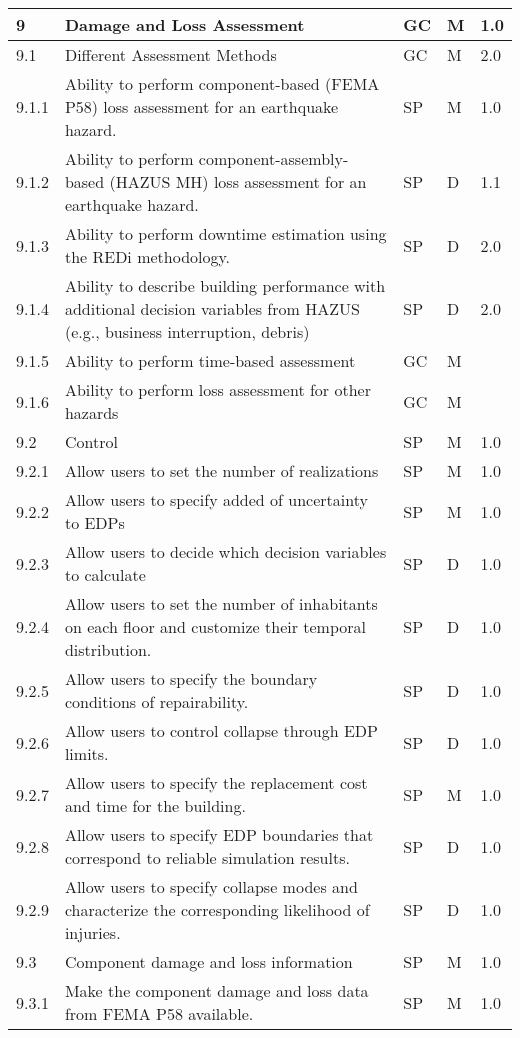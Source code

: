 \begin{longtable}{| p{} | p{} | p{} | p{} |  p{} |}
9 & \textbf{Damage and Loss Assessment} & GC & M & 1.0\\ \hline
9.1 & Different Assessment Methods & GC & M & 2.0 \\ \hline
9.1.1 & Ability to perform component-based (FEMA P58) loss assessment for an earthquake hazard. & SP & M & 1.0 \\ \hline
9.1.2 & Ability to perform component-assembly-based (HAZUS MH) loss assessment for an earthquake hazard. & SP & D & 1.1 \\ \hline
9.1.3 & Ability to perform downtime estimation using the REDi methodology. & SP & D & 2.0 \\ \hline
9.1.4 & Ability to describe building performance with additional decision variables from HAZUS (e.g., business interruption, debris) & SP & D & 2.0 \\ \hline
9.1.5 &  Ability to perform time-based assessment & GC & M &  \\ \hline
9.1.6 & Ability to perform loss assessment for other hazards & GC & M &  \\ \hline
9.2 & Control & SP & M & 1.0 \\ \hline
9.2.1 & Allow users to set the number of realizations & SP & M & 1.0\\ \hline
9.2.2 &  Allow users to specify added of uncertainty to EDPs & SP & M & 1.0 \\ \hline
9.2.3 &  Allow users to decide which decision variables to calculate & SP & D & 1.0 \\ \hline
9.2.4 &  Allow users to set the number of inhabitants on each floor and customize their temporal distribution. & SP & D & 1.0 \\ \hline
9.2.5 &  Allow users to specify the boundary conditions of repairability. & SP & D & 1.0 \\ \hline
9.2.6 &  Allow users to control collapse through EDP limits. & SP & D & 1.0\\ \hline
9.2.7 &  Allow users to specify the replacement cost and time for the building. & SP & M & 1.0 \\ \hline
9.2.8 &  Allow users to specify EDP boundaries that correspond to reliable simulation results. & SP & D & 1.0\\ \hline
9.2.9 & Allow users to specify collapse modes and characterize the corresponding likelihood of injuries. & SP & D & 1.0\\ \hline
9.3 & Component damage and loss information & SP & M & 1.0\\ \hline
9.3.1 & Make the component damage and loss data from FEMA P58 available. & SP & M & 1.0 \\ \hline

\end{longtable}
